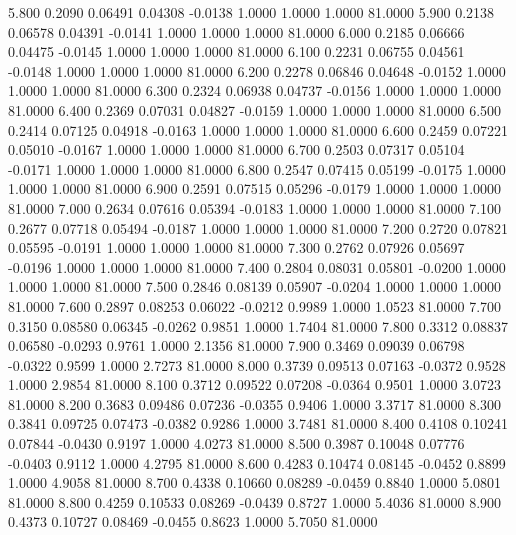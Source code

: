    5.800   0.2090   0.06491   0.04308  -0.0138   1.0000   1.0000   1.0000  81.0000
   5.900   0.2138   0.06578   0.04391  -0.0141   1.0000   1.0000   1.0000  81.0000
   6.000   0.2185   0.06666   0.04475  -0.0145   1.0000   1.0000   1.0000  81.0000
   6.100   0.2231   0.06755   0.04561  -0.0148   1.0000   1.0000   1.0000  81.0000
   6.200   0.2278   0.06846   0.04648  -0.0152   1.0000   1.0000   1.0000  81.0000
   6.300   0.2324   0.06938   0.04737  -0.0156   1.0000   1.0000   1.0000  81.0000
   6.400   0.2369   0.07031   0.04827  -0.0159   1.0000   1.0000   1.0000  81.0000
   6.500   0.2414   0.07125   0.04918  -0.0163   1.0000   1.0000   1.0000  81.0000
   6.600   0.2459   0.07221   0.05010  -0.0167   1.0000   1.0000   1.0000  81.0000
   6.700   0.2503   0.07317   0.05104  -0.0171   1.0000   1.0000   1.0000  81.0000
   6.800   0.2547   0.07415   0.05199  -0.0175   1.0000   1.0000   1.0000  81.0000
   6.900   0.2591   0.07515   0.05296  -0.0179   1.0000   1.0000   1.0000  81.0000
   7.000   0.2634   0.07616   0.05394  -0.0183   1.0000   1.0000   1.0000  81.0000
   7.100   0.2677   0.07718   0.05494  -0.0187   1.0000   1.0000   1.0000  81.0000
   7.200   0.2720   0.07821   0.05595  -0.0191   1.0000   1.0000   1.0000  81.0000
   7.300   0.2762   0.07926   0.05697  -0.0196   1.0000   1.0000   1.0000  81.0000
   7.400   0.2804   0.08031   0.05801  -0.0200   1.0000   1.0000   1.0000  81.0000
   7.500   0.2846   0.08139   0.05907  -0.0204   1.0000   1.0000   1.0000  81.0000
   7.600   0.2897   0.08253   0.06022  -0.0212   0.9989   1.0000   1.0523  81.0000
   7.700   0.3150   0.08580   0.06345  -0.0262   0.9851   1.0000   1.7404  81.0000
   7.800   0.3312   0.08837   0.06580  -0.0293   0.9761   1.0000   2.1356  81.0000
   7.900   0.3469   0.09039   0.06798  -0.0322   0.9599   1.0000   2.7273  81.0000
   8.000   0.3739   0.09513   0.07163  -0.0372   0.9528   1.0000   2.9854  81.0000
   8.100   0.3712   0.09522   0.07208  -0.0364   0.9501   1.0000   3.0723  81.0000
   8.200   0.3683   0.09486   0.07236  -0.0355   0.9406   1.0000   3.3717  81.0000
   8.300   0.3841   0.09725   0.07473  -0.0382   0.9286   1.0000   3.7481  81.0000
   8.400   0.4108   0.10241   0.07844  -0.0430   0.9197   1.0000   4.0273  81.0000
   8.500   0.3987   0.10048   0.07776  -0.0403   0.9112   1.0000   4.2795  81.0000
   8.600   0.4283   0.10474   0.08145  -0.0452   0.8899   1.0000   4.9058  81.0000
   8.700   0.4338   0.10660   0.08289  -0.0459   0.8840   1.0000   5.0801  81.0000
   8.800   0.4259   0.10533   0.08269  -0.0439   0.8727   1.0000   5.4036  81.0000
   8.900   0.4373   0.10727   0.08469  -0.0455   0.8623   1.0000   5.7050  81.0000
